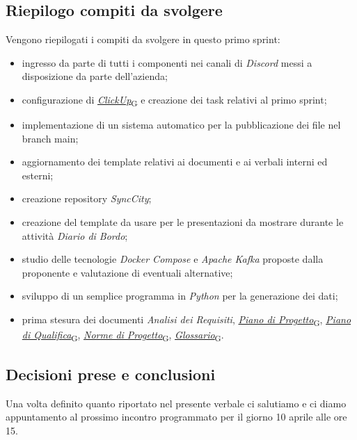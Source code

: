 \documentclass[italian,12pt]{article}
\begin{document}
\subsection{Riepilogo compiti da svolgere}
Vengono riepilogati i compiti da svolgere in questo primo sprint:
\begin{itemize}
	\item ingresso da parte di tutti i componenti nei canali di \textit{Discord} messi a disposizione da parte dell'azienda;
	\item configurazione di \href{https://7last.github.io/docs/rtb/documentazione-interna/glossario#clickup}{\textit{ClickUp}\textsubscript{G}} e creazione dei task relativi al primo sprint;
	\item implementazione di un sistema automatico per la pubblicazione dei file nel branch main;
	\item aggiornamento dei template relativi ai documenti e ai verbali interni ed esterni;
	\item creazione repository \textit{SyncCity};
	\item creazione del template da usare per le presentazioni da mostrare durante le attività \textit{Diario di Bordo};
	\item studio delle tecnologie \textit{Docker Compose} e \textit{Apache Kafka} proposte dalla proponente e valutazione di eventuali alternative;
	\item sviluppo di un semplice programma in \textit{Python} per la generazione dei dati;
	\item prima stesura dei documenti \textit{Analisi dei Requisiti}, \href{https://7last.github.io/docs/rtb/documentazione-interna/glossario#piano-di-progetto}{\textit{Piano di Progetto}\textsubscript{G}}, \href{https://7last.github.io/docs/rtb/documentazione-interna/glossario#piano-di-qualifica}{\textit{Piano di Qualifica}\textsubscript{G}}, \href{https://7last.github.io/docs/rtb/documentazione-interna/glossario#norme-di-progetto}{\textit{Norme di Progetto}\textsubscript{G}}, \href{https://7last.github.io/docs/rtb/documentazione-interna/glossario#glossario}{\textit{Glossario}\textsubscript{G}}.
\end{itemize}

\subsection{Decisioni prese e conclusioni}
Una volta definito quanto riportato nel presente verbale ci salutiamo e ci diamo appuntamento al prossimo incontro programmato 
per il giorno 10 aprile alle ore 15.
\end{document}
